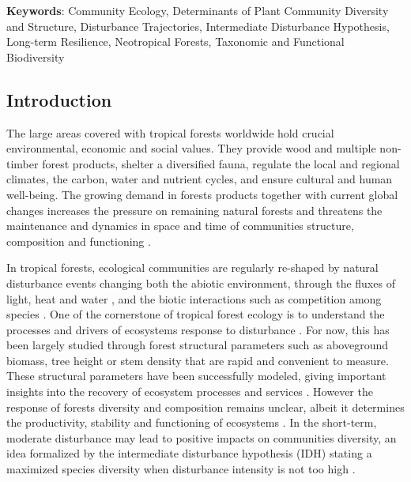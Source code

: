 \documentclass[
  11pt,
  french,
  A4paper,
  extrafontsizes,onecolumn,openright
  ]{memoir}
\begin{document}
\textbf{Keywords}: Community Ecology, Determinants of Plant Community
Diversity and Structure, Disturbance Trajectories, Intermediate
Disturbance Hypothesis, Long-term Resilience, Neotropical Forests,
Taxonomic and Functional Biodiversity

\subsection{Introduction}\label{introduction-1}

The large areas covered with tropical forests worldwide hold crucial
environmental, economic and social values. They provide wood and
multiple non-timber forest products, shelter a diversified fauna,
regulate the local and regional climates, the carbon, water and nutrient
cycles, and ensure cultural and human well-being. The growing demand in
forests products together with current global changes increases the
pressure on remaining natural forests \autocite{Morales-Hidalgo2015} and
threatens the maintenance and dynamics in space and time of communities
structure, composition and functioning \autocite{Anderson-Teixeira2013}.

In tropical forests, ecological communities are regularly re-shaped by
natural disturbance events changing both the abiotic environment,
through the fluxes of light, heat and water
\autocite{Goulamoussene2017}, and the biotic interactions such as
competition among species \autocite{Chesson2000}. One of the cornerstone
of tropical forest ecology is to understand the processes and drivers of
ecosystems response to disturbance \autocite{Chazdon2003a}. For now,
this has been largely studied through forest structural parameters such
as aboveground biomass, tree height or stem density
\autocites{Piponiot2016}{Rutishauser2016} that are rapid and convenient
to measure. These structural parameters have been successfully modeled,
giving important insights into the recovery of ecosystem processes and
services \autocite{Herault2018}. However the response of forests
diversity and composition remains unclear, albeit it determines the
productivity, stability and functioning of ecosystems
\autocite{Liang2016}. In the short-term, moderate disturbance may lead
to positive impacts on communities diversity, an idea formalized by the
intermediate disturbance hypothesis (IDH) stating a maximized species
diversity when disturbance intensity is not too high
\autocite{Kariuki2006a}.
\end{document}

